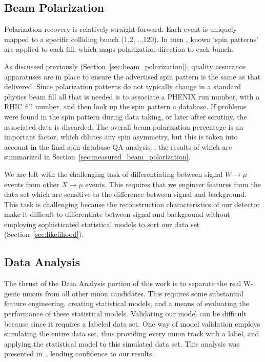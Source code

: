 \subsection{Beam Polarization}

Polarization recovery is relatively straight-forward. Each event is uniquely
mapped to a specific colliding bunch (1,2,...,120). In turn , known `spin
patterns' are applied to each fill, which maps polarization direction to each
bunch. 

As discussed previously (Section~\ref{sec:beam_polarization}), quality assurance
apparatuses are in place to ensure the advertised spin pattern is the same as
that delivered. Since polarization patterns do not typically change in a
standard physics beam fill all that is needed is to associate a PHENIX run
number, with a RHIC fill number, and then look up the spin pattern a database.
If problems were found in the spin pattern during data taking, or later after
scrutiny, the associated data is discarded. The overall beam polarization
percentage is an important factor, which dilutes any spin asymmetry, but this is
taken into account in the final spin database QA analysis~\cite{Kim2014}, the
results of which are summarized in Section~\ref{sec:measured_beam_polarization}.

We are left with the challenging task of differentiating between signal
$W\rightarrow\mu$ events from other $X\rightarrow\mu$ events. This requires that
we engineer features from the data set which are sensitive to the difference
between signal and background. This task is challenging because the
reconstruction characteristics of our detector make it difficult to
differentiate between signal and background without employing sophisticated
statistical models to sort our data set (Section~\ref{sec:likelihood}).


\subsection{Data Analysis}

The thrust of the Data Analysis portion of this work is to separate the real
W-genic muons from all other muon candidates. This requires some substantial
feature engineering, creating statistical models, and a means of evaluating the
performance of these statistical models. Validating our model can be difficult
because since it requires a labeled data set. One way of model validation
employs simulating the entire data set, thus providing every muon track with a
label, and applying the statistical model to this simulated data set. This
analysis was presented in~\cite{Seidl2014a}, lending confidence to our results.

